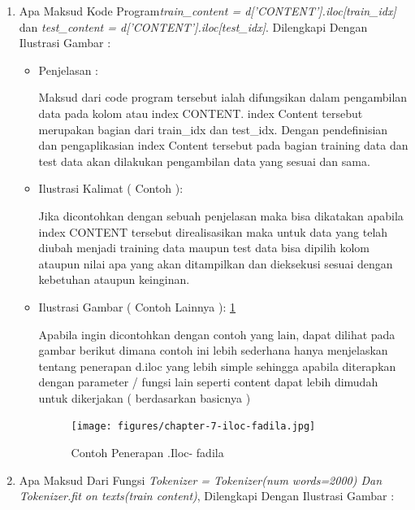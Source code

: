 \begin{enumerate}
\par
\par
\par
\item Apa Maksud Kode Program\emph{train\_content = d['CONTENT'].iloc[train\_idx]} dan \emph{test\_content = d['CONTENT'].iloc[test\_idx]}. Dilengkapi Dengan Ilustrasi Gambar :
\begin{itemize}
\item Penjelasan	:
\par Maksud dari code program tersebut ialah difungsikan dalam pengambilan data pada kolom atau index CONTENT. index Content tersebut merupakan bagian dari train\_idx dan test\_idx. Dengan pendefinisian dan pengaplikasian index Content tersebut pada bagian training data dan test data akan dilakukan pengambilan data yang sesuai dan sama.
\par
\par
\item Ilustrasi Kalimat ( Contoh ):
\par Jika dicontohkan dengan sebuah penjelasan maka bisa dikatakan apabila index CONTENT tersebut direalisasikan maka untuk data yang telah diubah menjadi training data maupun test data bisa dipilih kolom ataupun nilai apa yang akan ditampilkan dan dieksekusi sesuai dengan kebetuhan ataupun keinginan.
\par
\par 
\item Ilustrasi Gambar ( Contoh Lainnya ): \ref{chapter-7-iloc-fadila}
\par Apabila ingin dicontohkan dengan contoh yang lain, dapat dilihat pada gambar berikut dimana contoh ini lebih sederhana hanya menjelaskan tentang penerapan d.iloc yang lebih simple sehingga apabila diterapkan dengan parameter / fungsi lain seperti content dapat lebih dimudah untuk dikerjakan ( berdasarkan basicnya )
\par
\begin{figure}[!hbtp]
\centering
\texttt{[image: figures/chapter-7-iloc-fadila.jpg]}
\caption{Contoh Penerapan .Iloc- fadila}
\label{chapter-7-iloc-fadila}
\end{figure}
\par
\par
\end{itemize}
\par
\par
\par
\item Apa Maksud Dari Fungsi \emph{Tokenizer = Tokenizer(num words=2000) Dan Tokenizer.fit on texts(train content)}, Dilengkapi Dengan Ilustrasi Gambar :

\end{enumerate}
